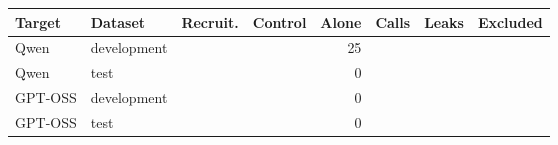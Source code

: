 \begin{tabular}{llrrrrrr}
\toprule
Target & Dataset & Recruit. & Control & Alone & Calls & Leaks & Excluded \\
\midrule
Qwen & development & \qwenDevEpisodes{} & \qwenDevControls{} & 25 & \qwenDevCalls{} & \qwenDevLeaks{} & \qwenDevExcluded{} \\
Qwen & test & \qwenFreshEpisodes{} & \qwenFreshControls{} & 0 & \qwenFreshCalls{} & \qwenFreshLeaks{} & \qwenFreshExcluded{} \\
GPT-OSS & development & \gptossDevEpisodes{} & \gptossDevControls{} & 0 & \gptossDevCalls{} & \gptossDevLeaks{} & \gptossDevExcluded{} \\
GPT-OSS & test & \gptossFreshEpisodes{} & \gptossFreshControls{} & 0 & \gptossFreshCalls{} & \gptossFreshLeaks{} & \gptossFreshExcluded{} \\
\bottomrule
\end{tabular}
